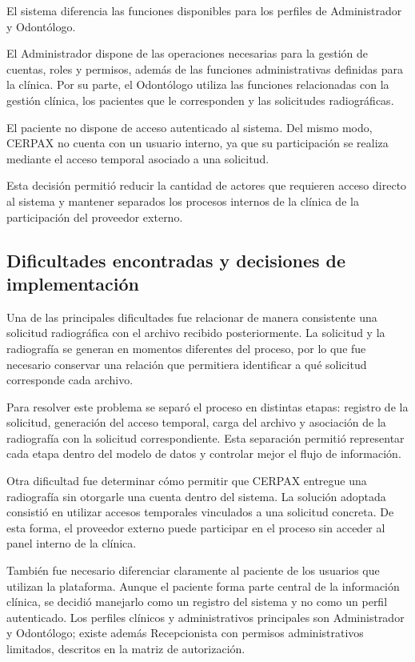El sistema diferencia las funciones disponibles para los perfiles de
Administrador y Odontólogo.

El Administrador dispone de las operaciones necesarias para la gestión de
cuentas, roles y permisos, además de las funciones administrativas definidas
para la clínica. Por su parte, el Odontólogo utiliza las funciones relacionadas
con la gestión clínica, los pacientes que le corresponden y las solicitudes
radiográficas.

El paciente no dispone de acceso autenticado al sistema. Del mismo modo,
CERPAX no cuenta con un usuario interno, ya que su participación se realiza
mediante el acceso temporal asociado a una solicitud.

Esta decisión permitió reducir la cantidad de actores que requieren acceso
directo al sistema y mantener separados los procesos internos de la clínica
de la participación del proveedor externo.

\subsection{Dificultades encontradas y decisiones de implementación}

Una de las principales dificultades fue relacionar de manera consistente una
solicitud radiográfica con el archivo recibido posteriormente. La solicitud y
la radiografía se generan en momentos diferentes del proceso, por lo que fue
necesario conservar una relación que permitiera identificar a qué solicitud
corresponde cada archivo.

Para resolver este problema se separó el proceso en distintas etapas: registro
de la solicitud, generación del acceso temporal, carga del archivo y
asociación de la radiografía con la solicitud correspondiente. Esta separación
permitió representar cada etapa dentro del modelo de datos y controlar mejor
el flujo de información.

Otra dificultad fue determinar cómo permitir que CERPAX entregue una
radiografía sin otorgarle una cuenta dentro del sistema. La solución adoptada
consistió en utilizar accesos temporales vinculados a una solicitud concreta.
De esta forma, el proveedor externo puede participar en el proceso sin acceder
al panel interno de la clínica.

También fue necesario diferenciar claramente al paciente de los usuarios que
utilizan la plataforma. Aunque el paciente forma parte central de la
información clínica, se decidió manejarlo como un registro del sistema y no
como un perfil autenticado. Los perfiles clínicos y administrativos principales son Administrador y
Odontólogo; existe además Recepcionista con permisos administrativos
limitados, descritos en la matriz de autorización.

